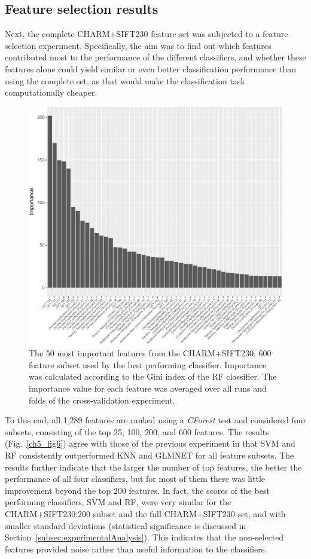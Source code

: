 \subsection{Feature selection results}
\label{subsec:featureSelectionResults}
Next, the complete CHARM+SIFT230 feature set was subjected to a feature selection experiment. Specifically, the aim was to find out which features contributed most to the performance of the different classifiers, and whether these features alone could yield similar or even better classification performance than using the complete set, as that would make the classification task computationally cheaper.
\begin{figure}[h!]
	\centering
	\includegraphics[width=\columnwidth]{fig08}
	\caption{The 50 most important features from the CHARM+SIFT230: 600 feature subset used by the best performing classifier. Importance was calculated according to the Gini index of the RF classifier. The importance value for each feature was averaged over all runs and folds of the cross-validation experiment.}
	\label{ch5_fig8}
\end{figure}
To this end, all 1,289 features are ranked using a \textit{CForest} test \cite{strobl2009party} and considered four subsets, consisting of the top 25, 100, 200, and 600 features. The results (Fig.~\ref{ch5_fig6}) agree with those of the previous experiment in that SVM and RF consistently outperformed KNN and GLMNET for all feature subsets. The results further indicate that the larger the number of top features, the better the performance of all four classifiers, but for most of them there was little improvement beyond the top 200 features. In fact, the scores of the best performing classifiers, SVM and RF, were very similar for the CHARM+SIFT230:200 subset and the full CHARM+SIFT230 set, and with smaller standard deviations (statistical significance is discussed in Section~\ref{subsec:experimentalAnalysis}). This indicates that the non-selected features provided noise rather than useful information to the classifiers.

